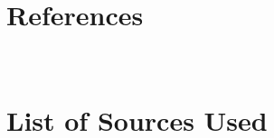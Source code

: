\documentclass[draft]{article}
\begin{document}
\newpage
\section{References}
\begin{hangparas}{0.5in}{1}
~\\
\end{hangparas}

\newpage
\section*{List of Sources Used}
\begin{hangparas}{0.5in}{1}
~\\
\end{hangparas}
\end{document}
